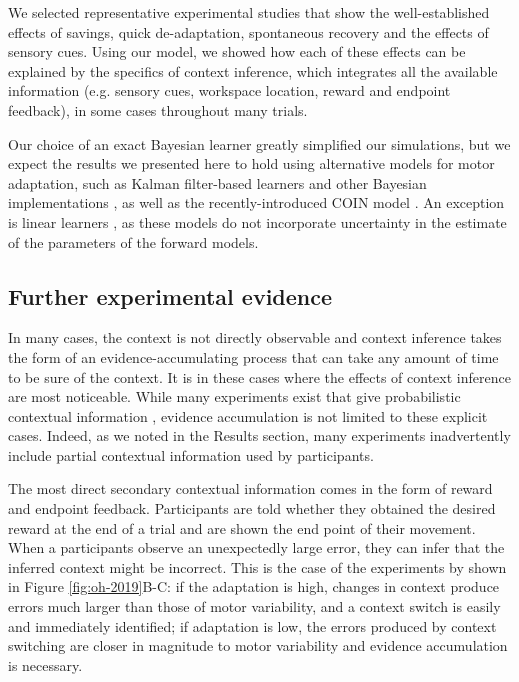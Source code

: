 \documentclass[a4paper,doc,floatsintext,natbib]{apa6}%
\def \fref #1{Figure \ref{#1}}     %
\begin{document}
We selected representative experimental studies that show the well-established effects of savings, quick de-adaptation, spontaneous recovery and the effects of sensory cues. Using our model, we showed how each of these effects can be explained by the specifics of context inference, which integrates all the available information (e.g. sensory cues, workspace location, reward and endpoint feedback), in some cases throughout many trials.

Our choice of an exact Bayesian learner greatly simplified our simulations, but we expect the results we presented here to hold using alternative models for motor adaptation, such as Kalman filter-based learners \cite[e.g.][]{Oh_Minimizing_2019,Baddeley_System_2003} and other Bayesian implementations \cite[e.g.][]{Wolpert_Multiple_1998,Kording_Bayesian_2004}, as well as the recently-introduced COIN model \citep{Heald_Contextual_2021}. An exception is linear learners \cite[e.g.][]{Smith_Interacting_2006,Forano_Timescales_2020,Lee_Dual_2009}, as these models do not incorporate uncertainty in the estimate of the parameters of the forward models.

\subsection{Further experimental evidence}
In many cases, the context is not directly observable and context inference takes the form of an evidence-accumulating process that can take any amount of time to be sure of the context. It is in these cases where the effects of context inference are most noticeable. While many experiments exist that give probabilistic contextual information \cite[e.g.][]{Scholz_uncontrolled_1999,Behrens_Learning_2007,Nassar_Dissociable_2019}, evidence accumulation is not limited to these explicit cases. Indeed, as we noted in the Results section, many experiments inadvertently include partial contextual information used by participants.

The most direct secondary contextual information comes in the form of reward and endpoint feedback. Participants are told whether they obtained the desired reward at the end of a trial and are shown the end point of their movement. When a participants observe an unexpectedly large error, they can infer that the inferred context might be incorrect. This is the case of the experiments by \cite{Oh_Minimizing_2019} shown in \fref{fig:oh-2019}B-C: if the adaptation is high, changes in context produce errors much larger than those of motor variability, and a context switch is easily and immediately identified; if adaptation is low, the errors produced by context switching are closer in magnitude to motor variability and evidence accumulation is necessary.
\end{document}
